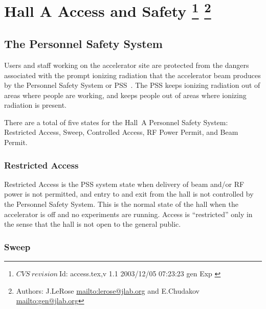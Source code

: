 \chapter[Hall A Access and Safety]{Hall A Access and Safety
\footnote{
  $CVS~revision~ $Id: access.tex,v 1.1 2003/12/05 07:23:23 gen Exp $ $ 
}
\footnote{Authors: J.LeRose \url{mailto:lerose@jlab.org} and
                   E.Chudakov \url{mailto:gen@jlab.org}}
}
 
\begin{safetyen}{10}{15}
\section{The Personnel Safety System} 
\end{safetyen}

 Users and staff working on the accelerator site are protected from
 the dangers associated with the prompt ionizing radiation that the
 accelerator beam produces by the Personnel Safety System or 
 PSS~\cite{PSScebaf}.
 The PSS keeps ionizing radiation out of areas where people are working,
 and keeps people out of areas where ionizing radiation is present.

 There are a total of five states for the Hall~A Personnel Safety
 System: Restricted Access, Sweep, Controlled Access, RF Power Permit,
 and Beam Permit.

\begin{safetyen}{10}{10}
\subsection{Restricted Access}
\end{safetyen}
 
 Restricted Access is the PSS system state when delivery of beam
 and/or RF power is not permitted, and entry to and exit from the hall
 is not controlled by the Personnel Safety System.  This is the normal
 state of the hall when the accelerator is off and no experiments are
 running.  Access is ``restricted'' only in the sense that the hall is
 not open to the general public.

\begin{safetyen}{10}{10}
\subsection{Sweep}
\end{safetyen}

